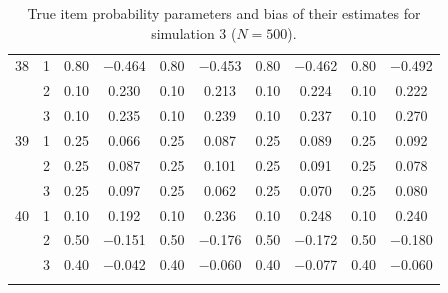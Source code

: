 \begin{longtable}{llcccccccc}
  38 & 1 & 0.80 & $-$0.464 & 0.80 & $-$0.453 & 0.80 & $-$0.462 & 0.80 & $-$0.492 \\ 
   & 2 & 0.10 & 0.230 & 0.10 & 0.213 & 0.10 & 0.224 & 0.10 & 0.222 \\ 
   & 3 & 0.10 & 0.235 & 0.10 & 0.239 & 0.10 & 0.237 & 0.10 & 0.270 \\ 
  39 & 1 & 0.25 & 0.066 & 0.25 & 0.087 & 0.25 & 0.089 & 0.25 & 0.092 \\ 
   & 2 & 0.25 & 0.087 & 0.25 & 0.101 & 0.25 & 0.091 & 0.25 & 0.078 \\ 
   & 3 & 0.25 & 0.097 & 0.25 & 0.062 & 0.25 & 0.070 & 0.25 & 0.080 \\ 
  40 & 1 & 0.10 & 0.192 & 0.10 & 0.236 & 0.10 & 0.248 & 0.10 & 0.240 \\ 
   & 2 & 0.50 & $-$0.151 & 0.50 & $-$0.176 & 0.50 & $-$0.172 & 0.50 & $-$0.180 \\ 
   & 3 & 0.40 & $-$0.042 & 0.40 & $-$0.060 & 0.40 & $-$0.077 & 0.40 & $-$0.060 \\ 
   \bottomrule
\caption{True item probability parameters and bias of their estimates for simulation 3 ($N = 500$).} 
\label{table:sim3_item_prob_bias_N500}
\end{longtable}
